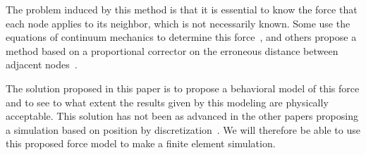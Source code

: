 The problem induced by this method is that it is essential to know the force that each node applies to its neighbor, which is not necessarily known. Some use the equations of continuum mechanics to determine this force~\cite{koenemann_modeling_2017, prabhakar_dynamics_2005}, and others propose a method based on a proportional corrector on the erroneous distance between adjacent nodes~\cite{ganoni_unreal,blintsov_development_2017}.

The solution proposed in this paper is to propose a behavioral model of this force and to see to what extent the results given by this modeling are physically acceptable. This solution has not been as advanced in the other papers proposing a simulation based on position by discretization~\cite{ganoni_unreal,blintsov_development_2017}. We will therefore be able to use this proposed force model to make a finite element simulation.